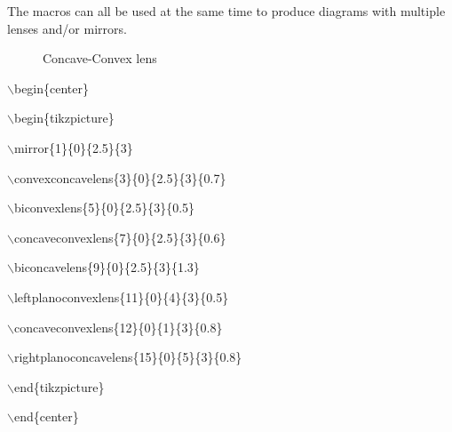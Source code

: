 \documentclass[12pt]{article}
\begin{document}
The macros can all be used at the same time to produce diagrams with multiple lenses and/or mirrors.


\begin{figure}[H]

\begin{center}


\end{center}

\caption{Concave-Convex lens}
\end{figure}

$\backslash$begin\{center\}

$\backslash$begin\{tikzpicture\}

$\backslash$mirror\{1\}\{0\}\{2.5\}\{3\}

$\backslash$convexconcavelens\{3\}\{0\}\{2.5\}\{3\}\{0.7\}

$\backslash$biconvexlens\{5\}\{0\}\{2.5\}\{3\}\{0.5\}

$\backslash$concaveconvexlens\{7\}\{0\}\{2.5\}\{3\}\{0.6\}

$\backslash$biconcavelens\{9\}\{0\}\{2.5\}\{3\}\{1.3\}

$\backslash$leftplanoconvexlens\{11\}\{0\}\{4\}\{3\}\{0.5\}

$\backslash$concaveconvexlens\{12\}\{0\}\{1\}\{3\}\{0.8\}

$\backslash$rightplanoconcavelens\{15\}\{0\}\{5\}\{3\}\{0.8\}

$\backslash$end\{tikzpicture\}

$\backslash$end\{center\}
\end{document}
